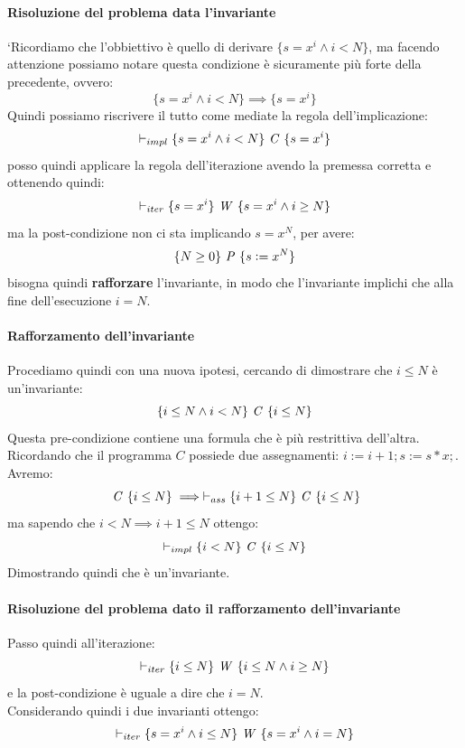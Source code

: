 \begin{esempio}
				      			\paragraph{Risoluzione del problema data l'invariante}
				      		`Ricordiamo che l'obbiettivo è quello di derivare $\{s=x^i\land i<N\}$, ma facendo attenzione possiamo notare questa condizione è sicuramente più forte della precedente, ovvero:
				      			\[\{s=x^i\land i<N\} \implies \{s=x^i\}\]
				      			Quindi possiamo riscrivere il tutto come mediate la regola dell'implicazione:
				      		\[\vdash_{impl} \{s=x^i\land i<N\}\mbox{ \textit{C} }\{s=x^i\}\]		
				      			posso quindi applicare la regola dell'iterazione avendo la premessa corretta e
				      			ottenendo quindi:
				      			\[\vdash_{iter}\{s=x^i\}\mbox{ \textit{W} }\{s=x^i\land i\geq N\}\]
				      			ma la post-condizione non ci sta implicando $s=x^N$, per avere:
				      			\[\{N\geq 0\}\mbox{ \textit{P} }\{s\cceq x^N\}\]
				      			bisogna quindi \textbf{rafforzare} l'invariante, in modo che l'invariante
				      			implichi che alla fine dell'esecuzione $i=N$.\\
				      			\paragraph{Rafforzamento dell'invariante}
				      			Procediamo quindi con una nuova ipotesi, cercando di dimostrare che $i\leq N$
				      			è un'invariante:
				      			\[\{i\leq N\land i<N\}\mbox{ \textit{C} }\{i\leq N\}\]
				      			Questa pre-condizione contiene una formula che è più restrittiva dell'altra.
				      			Ricordando che il programma $C$ possiede due assegnamenti: $i := i + 1; s := s * x;$. Avremo:
				      			\[\mbox{ \textit{C} }\{i\leq N\} \implies \vdash_{ass}\{i+1\leq N\}\mbox{ \textit{C} }\{i\leq N\} \]
				      			ma sapendo che $i<N\implies i+1\leq N$ ottengo:
				      			\[\vdash_{impl}\{i< N\}\mbox{ \textit{C} }\{i\leq N\}\]
				      			Dimostrando quindi che è un'invariante.\\
				      			\paragraph{Risoluzione del problema dato il rafforzamento dell'invariante}
				      			Passo quindi all'iterazione:
				      			\[\vdash_{iter}\{i\leq N\}\mbox{ \textit{W} }\{i\leq N\land i\geq N\}\]
				      			e la post-condizione è uguale a dire che $i=N$.\\
				      			Considerando quindi i due invarianti ottengo:
				      			\[\vdash_{iter}\{s=x^i\land i\leq N\}\mbox{ \textit{W} }
				      				\{s=x^i\land i= N\}\]

\end{esempio}

